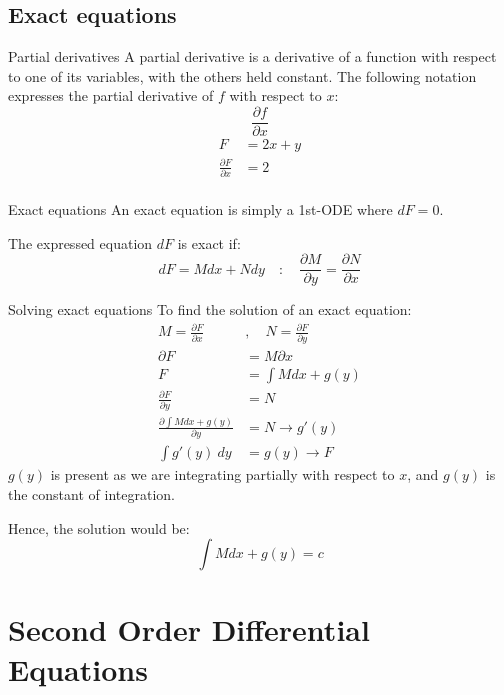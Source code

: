 \subsection{Exact equations}
\begin{knBox}
    {Partial derivatives}
    A partial derivative is a derivative of a function with respect to one of its variables, with the others held constant. The following notation expresses the partial derivative of $f$ with respect to $x$:
    \[\frac{\partial f}{\partial x}\]
    \tcblower
    \begin{align*}
        F                             & =2x+y \\
        \frac{\partial F}{\partial x} & =2    \\
    \end{align*}
\end{knBox}
\begin{definition}
    {Exact equations}
    An exact equation is simply a 1st-ODE where $dF=0$.

    The expressed equation $dF$ is exact if:
    \[dF=Mdx+Ndy\quad:\quad\frac{\partial M}{\partial y}=\frac{\partial N}{\partial x}\]
\end{definition}
\begin{theorem}
    {Solving exact equations}
    To find the solution of an exact equation:
    \begin{align*}
        M=\frac{\partial F}{\partial x}              & ,\quad N=\frac{\partial F}{\partial y} \\
        \partial F                                   & = M\partial x                          \\
        F                                            & = \int M dx + g(y)                     \\
        \frac{\partial F}{\partial y}                & = N                                    \\
        \frac{\partial \int M dx + g(y)}{\partial y} & = N \to g'(y)                          \\
        \int g'(y)\:dy                               & = g(y) \to F
    \end{align*}
    $g(y)$ is present as we are integrating partially with respect to $x$, and $g(y)$ is the constant of integration.

    Hence, the solution would be:
    \[\int M dx + g(y)=c\]
\end{theorem}

\section{Second Order Differential Equations}

